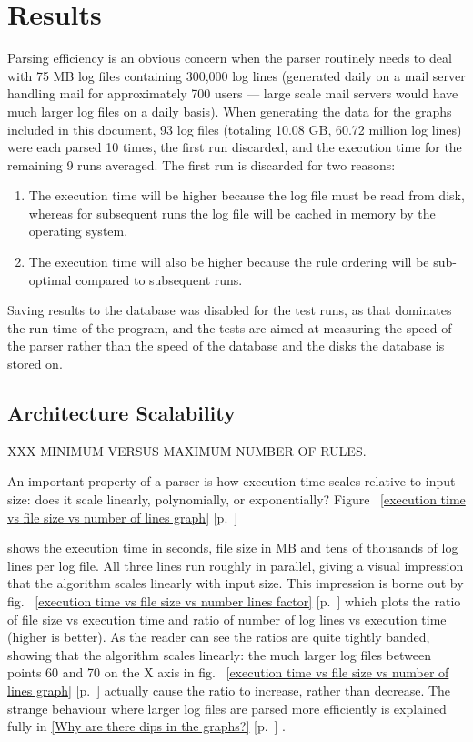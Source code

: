 \documentclass[draft]{svmult}
\newcommand{\refwithpage}[1]{%
    \empty{}\ref{#1} [p.~\pageref{#1}]%
}
\newcommand{\sectionref}[1]{%
    \textsection{}\refwithpage{#1}%
}
\newcommand{\numberOFlogFILES}[0]{%
    93%
}
\newcommand{\numberOFlogLINEShuman}[0]{%
    60.72 million%
}
\begin{document}
\section{Results}

Parsing efficiency is an obvious concern when the parser routinely needs to
deal with 75 MB log files containing 300,000 log lines (generated daily on
a mail server handling mail for approximately 700 users --- large scale
mail servers would have much larger log files on a daily basis).  When
generating the data for the graphs included in this document,
\numberOFlogFILES{} log files (totaling 10.08 GB, \numberOFlogLINEShuman{}
log lines) were each parsed 10 times, the first run discarded, and the
execution time for the remaining 9 runs averaged.  The first run is
discarded for two reasons:

\begin{enumerate}

    \item The execution time will be higher because the log file must be
        read from disk, whereas for subsequent runs the log file will be
        cached in memory by the operating system.

    \item The execution time will also be higher because the rule ordering
        will be sub-optimal compared to subsequent runs.

\end{enumerate}

Saving results to the database was disabled for the test runs, as that
dominates the run time of the program, and the tests are aimed at measuring
the speed of the parser rather than the speed of the database and the disks
the database is stored on.

\subsection{Architecture Scalability}

XXX MINIMUM VERSUS MAXIMUM NUMBER OF RULES\@.

An important property of a parser is how execution time scales relative to
input size: does it scale linearly, polynomially, or exponentially?
Figure~\refwithpage{execution time vs file size vs number of lines graph}
shows the execution time in seconds, file size in MB and tens of thousands
of log lines per log file.  All three lines run roughly in parallel, giving
a visual impression that the algorithm scales linearly with input size.
This impression is borne out by fig.~\refwithpage{execution time vs file
size vs number lines factor} which plots the ratio of file size vs
execution time and ratio of number of log lines vs execution time (higher
is better).  As the reader can see the ratios are quite tightly banded,
showing that the algorithm scales linearly: the much larger log files
between points 60 and 70 on the X axis in fig.~\refwithpage{execution time
vs file size vs number of lines graph} actually cause the ratio to
increase, rather than decrease.  The strange behaviour where larger log
files are parsed more efficiently is explained fully in \sectionref{Why are
there dips in the graphs?}.  
\end{document}
